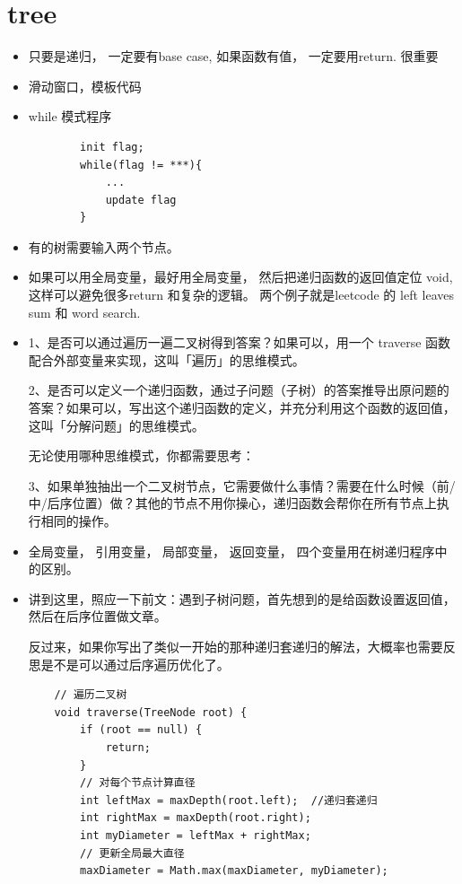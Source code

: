\documentclass[a4paper,11pt,twoside]{book}
\begin{document}
\section{tree}
\begin{itemize}
	\item 只要是递归， 一定要有base case, 如果函数有值， 一定要用return.  很重要
	
	\item 滑动窗口，模板代码
	
	\item  while 模式程序
	\begin{lstlisting}
		init flag;
		while(flag != ***){
			...
			update flag
		}
	\end{lstlisting}

	\item 有的树需要输入两个节点。
	
	\item 如果可以用全局变量，最好用全局变量， 然后把递归函数的返回值定位 void, 这样可以避免很多return 和复杂的逻辑。 两个例子就是leetcode 的 left leaves sum 和 word search.
	
\item 1、是否可以通过遍历一遍二叉树得到答案？如果可以，用一个 traverse 函数配合外部变量来实现，这叫「遍历」的思维模式。

2、是否可以定义一个递归函数，通过子问题（子树）的答案推导出原问题的答案？如果可以，写出这个递归函数的定义，并充分利用这个函数的返回值，这叫「分解问题」的思维模式。

无论使用哪种思维模式，你都需要思考：

3、如果单独抽出一个二叉树节点，它需要做什么事情？需要在什么时候（前/中/后序位置）做？其他的节点不用你操心，递归函数会帮你在所有节点上执行相同的操作。

\item 全局变量， 引用变量， 局部变量， 返回变量， 四个变量用在树递归程序中的区别。

\item 讲到这里，照应一下前文：遇到子树问题，首先想到的是给函数设置返回值，然后在后序位置做文章。

反过来，如果你写出了类似一开始的那种递归套递归的解法，大概率也需要反思是不是可以通过后序遍历优化了。

\begin{lstlisting}
	// 遍历二叉树
	void traverse(TreeNode root) {
		if (root == null) {
			return;
		}
		// 对每个节点计算直径
		int leftMax = maxDepth(root.left);  //递归套递归
		int rightMax = maxDepth(root.right);
		int myDiameter = leftMax + rightMax;
		// 更新全局最大直径
		maxDiameter = Math.max(maxDiameter, myDiameter);
		

\end{lstlisting}
\end{itemize}
\end{document}
